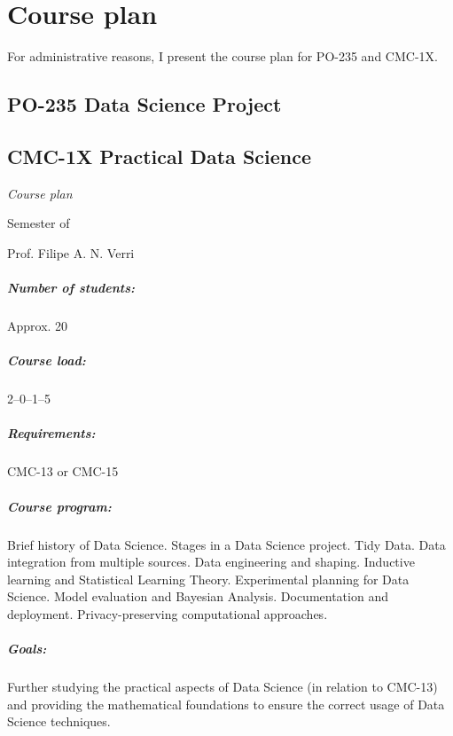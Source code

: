 \chapter*{Course plan}

For administrative reasons, I present the course plan for PO-235 and CMC-1X.

\newpage
{}
\thispagestyle{empty}
\section*{PO-235 Data Science Project}

\newpage
{}
\thispagestyle{empty}
\section*{CMC-1X Practical Data Science}

\emph{Course plan}

 Semester of \the\year{}

Prof. Filipe A. N. Verri

\paragraph{Number of students:} Approx. 20

\paragraph{Course load:} 2--0--1--5

\paragraph{Requirements:} CMC-13 or CMC-15

\paragraph{Course program:}
Brief history of Data Science. Stages in a Data Science project. Tidy Data. Data
integration from multiple sources. Data engineering and shaping. Inductive learning and
Statistical Learning Theory. Experimental planning for Data Science. Model evaluation and
Bayesian Analysis. Documentation and deployment. Privacy-preserving computational
approaches.

\paragraph{Goals:}
Further studying the practical aspects of Data Science (in relation to CMC-13) and providing
the mathematical foundations to ensure the correct usage of Data Science techniques.

